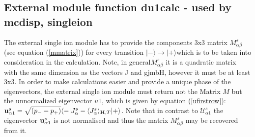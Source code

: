 \subsection{External module function {\prg du1calc} - used by {\prg mcdisp},{\prg %
singleion}}

The external single ion module has to provide the components 3x3 
matrix $M^s_{\alpha\beta}$ (see equation (\ref{mmatrix})) for every transition
$|-\rangle \rightarrow |+\rangle$which is to be taken into consideration 
in the calculation. Note, in general$M^s_{\alpha\beta}$ it is a quadratic matrix with the same
dimension as the vectors J and gjmbH, however it must be at least 3x3. 
In order to make calculations easier and provide a unique phase of the eigenvectors, the 
external single ion module must return not the Matrix $M$ but the unnormalized
eigenvector $u1$, which is given by equation (\ref{ufirstrow}): ${\mathbf u^s_{\alpha1}}=\sqrt{(p_--p_+)}\langle -|J^s_{\alpha}-\langle J^s_{\alpha}\rangle_{\mathbf H,T}|+\rangle$. Note that in contrast to ${\mathcal U^s_{\alpha1}}$ the eigenvector
${\mathbf u^s_{\alpha1}}$ is not normalised and thus the matrix  $M^s_{\alpha\beta}$ may be recovered from it.

